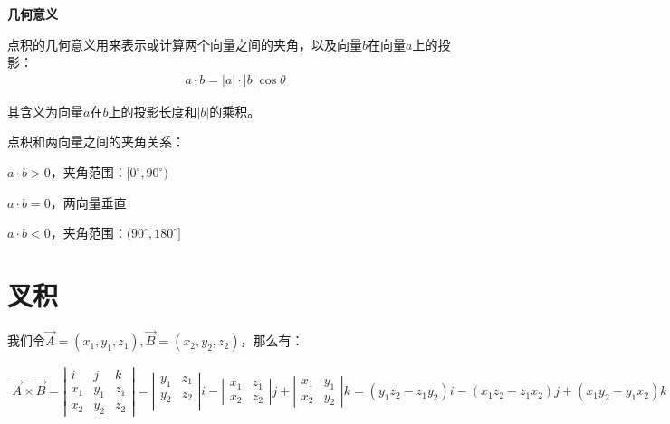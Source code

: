 \textbf{几何意义}\par
点积的几何意义用来表示或计算两个向量之间的夹角，以及向量$b$在向量$a$上的投影：
\begin{eqnarray*}
	a \cdot b = |a| \cdot |b|\cos\theta
\end{eqnarray*} \par

其含义为向量$a$在$b$上的投影长度和$|b|$的乘积。\par

点积和两向量之间的夹角关系：\par
$a \cdot b > 0$，夹角范围：$[0^\circ, 90^\circ)$ \par
$a \cdot b = 0$，两向量垂直 \par
$a \cdot b < 0$，夹角范围：$(90^\circ, 180^\circ]$ \par

\section{叉积}
我们令$\overrightarrow{A} = (x_1, y_1, z_1), \overrightarrow{B} = (x_2, y_2, z_2)$，那么有：\par
\begin{eqnarray*}
\overrightarrow{A} \times \overrightarrow{B} = 
\left|
\begin{array} {cccc}
 i &    j    & k \\ 
 x_1 &  y_1   & z_1\\ 
 x_2 & y_2 & z_2 
\end{array}
\right| 
= 
\left|
\begin{array}{cccc}
y_1 & z_1 \\
y_2 & z_2 \\
\end{array}
\right|i
- 
\left|
\begin{array}{cccc}
x_1 & z_1 \\
x_2 & z_2 
\end{array}
\right|j
+ 
\left|
\begin{array}{cccc}
x_1 & y_1 \\
x_2 & y_2
\end{array}
\right|k
= (y_1z_2 - z_1y_2)i - (x_1z_2 - z_1x_2)j + (x_1y_2 - y_1x_2)k 
\end{eqnarray*}

